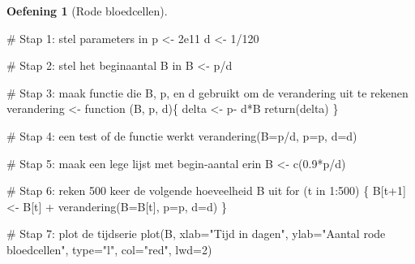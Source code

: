\documentclass[
  a4paper,
]{scrbook}
\newenvironment{Shaded}{\begin{snugshade}}{\end{snugshade}}
\newcommand{\AttributeTok}[1]{\textcolor[rgb]{0.40,0.45,0.13}{#1}}
\newcommand{\CommentTok}[1]{\textcolor[rgb]{0.37,0.37,0.37}{#1}}
\newcommand{\ControlFlowTok}[1]{\textcolor[rgb]{0.00,0.23,0.31}{#1}}
\newcommand{\DecValTok}[1]{\textcolor[rgb]{0.68,0.00,0.00}{#1}}
\newcommand{\FloatTok}[1]{\textcolor[rgb]{0.68,0.00,0.00}{#1}}
\newcommand{\FunctionTok}[1]{\textcolor[rgb]{0.28,0.35,0.67}{#1}}
\newcommand{\NormalTok}[1]{\textcolor[rgb]{0.00,0.23,0.31}{#1}}
\newcommand{\OtherTok}[1]{\textcolor[rgb]{0.00,0.23,0.31}{#1}}
\newcommand{\SpecialCharTok}[1]{\textcolor[rgb]{0.37,0.37,0.37}{#1}}
\newcommand{\StringTok}[1]{\textcolor[rgb]{0.13,0.47,0.30}{#1}}
\theoremstyle{definition}
\newtheorem{exercise}{Oefening}[chapter]
\theoremstyle{remark}
\begin{document}
\begin{exercise}[Rode
bloedcellen]
\begin{Shaded}
\begin{Highlighting}[]
\CommentTok{\# Stap 1: stel parameters in}
\NormalTok{p }\OtherTok{\textless{}{-}} \FloatTok{2e11}    
\NormalTok{d }\OtherTok{\textless{}{-}} \DecValTok{1}\SpecialCharTok{/}\DecValTok{120}   

\CommentTok{\# Stap 2: stel het beginaantal B in}
\NormalTok{B }\OtherTok{\textless{}{-}}\NormalTok{ p}\SpecialCharTok{/}\NormalTok{d}

\CommentTok{\# Stap 3: maak functie die B, p, en d gebruikt om de verandering uit te rekenen}
\NormalTok{verandering }\OtherTok{\textless{}{-}} \ControlFlowTok{function}\NormalTok{ (B, p, d)\{}
\NormalTok{  delta }\OtherTok{\textless{}{-}}\NormalTok{ p}\SpecialCharTok{{-}}\NormalTok{ d}\SpecialCharTok{*}\NormalTok{B}
  \FunctionTok{return}\NormalTok{(delta)}
\NormalTok{\}}

\CommentTok{\# Stap 4: een test of de functie werkt}
\FunctionTok{verandering}\NormalTok{(}\AttributeTok{B=}\NormalTok{p}\SpecialCharTok{/}\NormalTok{d, }\AttributeTok{p=}\NormalTok{p, }\AttributeTok{d=}\NormalTok{d) }

\CommentTok{\# Stap 5: maak een lege lijst met begin{-}aantal erin}
\NormalTok{B }\OtherTok{\textless{}{-}} \FunctionTok{c}\NormalTok{(}\FloatTok{0.9}\SpecialCharTok{*}\NormalTok{p}\SpecialCharTok{/}\NormalTok{d)}

\CommentTok{\# Stap 6: reken 500 keer de volgende hoeveelheid B uit}
\ControlFlowTok{for}\NormalTok{ (t }\ControlFlowTok{in} \DecValTok{1}\SpecialCharTok{:}\DecValTok{500}\NormalTok{) \{}
\NormalTok{  B[t}\SpecialCharTok{+}\DecValTok{1}\NormalTok{] }\OtherTok{\textless{}{-}}\NormalTok{ B[t] }\SpecialCharTok{+} \FunctionTok{verandering}\NormalTok{(}\AttributeTok{B=}\NormalTok{B[t], }\AttributeTok{p=}\NormalTok{p, }\AttributeTok{d=}\NormalTok{d)}
\NormalTok{\}}

\CommentTok{\# Stap 7: plot de tijdserie}
\FunctionTok{plot}\NormalTok{(B, }\AttributeTok{xlab=}\StringTok{"Tijd in dagen"}\NormalTok{, }\AttributeTok{ylab=}\StringTok{"Aantal rode bloedcellen"}\NormalTok{, }\AttributeTok{type=}\StringTok{"l"}\NormalTok{, }\AttributeTok{col=}\StringTok{"red"}\NormalTok{, }\AttributeTok{lwd=}\DecValTok{2}\NormalTok{)}
\end{Highlighting}
\end{Shaded}


\end{exercise}
\end{document}
